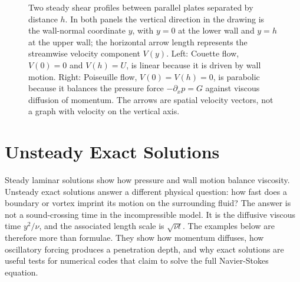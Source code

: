 \begin{figure}[htbp]
\centering
{}
\caption{Two steady shear profiles between parallel plates separated by
distance \(h\).  In both panels the vertical direction in the drawing is the
wall-normal coordinate \(y\), with \(y=0\) at the lower wall and \(y=h\) at the
upper wall; the horizontal arrow length represents the streamwise velocity
component \(V(y)\).  Left: Couette flow, \(V(0)=0\) and \(V(h)=U\), is linear
because it is driven by wall motion.  Right: Poiseuille flow,
\(V(0)=V(h)=0\), is parabolic because it balances the pressure force
\(-\partial_xp=G\) against viscous diffusion of momentum.  The arrows are
spatial velocity vectors, not a graph with velocity on the vertical axis.}
\label{fig:couette-poiseuille-profiles}
\end{figure}

\section{Unsteady Exact Solutions}
\label{sec:unsteady-exact-ns-solutions}

Steady laminar solutions show how pressure and wall motion balance viscosity.
Unsteady exact solutions answer a different physical question: how fast does a
boundary or vortex imprint its motion on the surrounding fluid? The answer is
not a sound-crossing time in the incompressible model. It is the diffusive
viscous time \(y^2/\nu\), and the associated length scale is
\(\sqrt{\nu t}\). The examples below are therefore more than formulae. They
show how momentum diffuses, how oscillatory forcing produces a penetration
depth, and why exact solutions are useful tests for numerical codes that claim
to solve the full Navier-Stokes equation.

